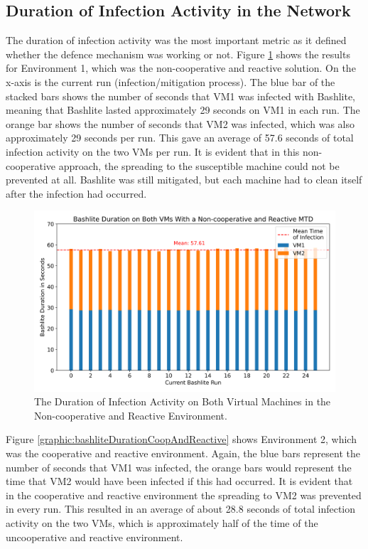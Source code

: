 \subsection{Duration of Infection Activity in the Network}
The duration of infection activity was the most important metric as it defined whether the defence mechanism was working or not. Figure \ref{graphic:tableEvaluationEnvironment} shows the results for Environment 1, which was the non-cooperative and reactive solution. On the x-axis is the current run (infection/mitigation process). The blue bar of the stacked bars shows the number of seconds that VM1 was infected with Bashlite, meaning that Bashlite lasted approximately 29 seconds on VM1 in each run. The orange bar shows the number of seconds that VM2 was infected, which was also approximately 29 seconds per run. This gave an average of 57.6 seconds of total infection activity on the two VMs per run. It is evident that in this non-cooperative approach, the spreading to the susceptible machine could not be prevented at all. Bashlite was still mitigated, but each machine had to clean itself after the infection had occurred. 

\begin{figure}[tph]
\includegraphics[scale=0.6]{assets/bashliteDurationUncoopAndReactive.png}
\centering
\caption{The Duration of Infection Activity on Both Virtual Machines in the Non-cooperative and Reactive Environment.}
\label{graphic:tableEvaluationEnvironment}
\end{figure}

Figure \ref{graphic:bashliteDurationCoopAndReactive} shows Environment 2, which was the cooperative and reactive environment. Again, the blue bars represent the number of seconds that VM1 was infected, the orange bars would represent the time that VM2 would have been infected if this had occurred. It is evident that in the cooperative and reactive environment the spreading to VM2 was prevented in every run. This resulted in an average of about 28.8 seconds of total infection activity on the two VMs, which is approximately half of the time of the uncooperative and reactive environment. 






